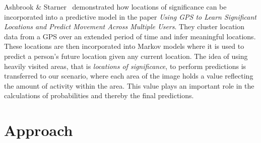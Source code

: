Ashbrook \& Starner~\cite{ashbrook} demonstrated how locations of significance can be incorporated into a predictive model in the paper \emph{Using GPS to Learn Significant Locations and Predict Movement Across Multiple Users}. They cluster location data from a GPS over an extended period of time and infer meaningful locations. These locations are then incorporated into Markov models where it is used to predict a person's future location given any current location. The idea of using heavily visited areas, that is \emph{locations of significance}, to perform predictions is transferred to our scenario, where each area of the image holds a value reflecting the amount of activity within the area. This value plays an important role in the calculations of probabilities and thereby the final predictions.

\section{Approach}

